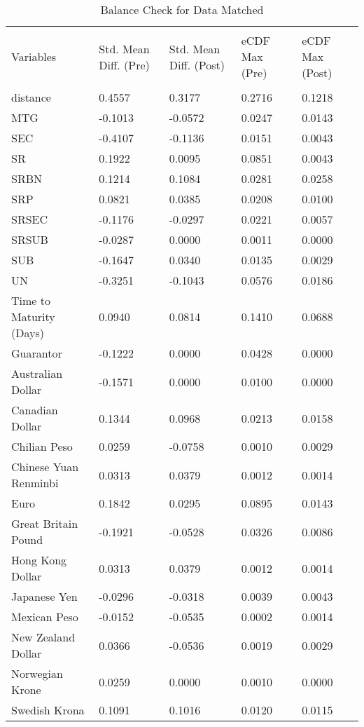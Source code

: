 \begin{table}[H]
\caption{Balance Check for Data Matched}
\scriptsize
\begin{tabular}{lllll}
\\[-1.8ex]\hline 
\hline \\[-1.8ex]
Variables & Std. Mean Diff. (Pre) & Std. Mean Diff. (Post) & eCDF Max (Pre) & eCDF Max (Post) \\
\hline \\[-1.8ex]
distance & 0.4557 & 0.3177 & 0.2716 & 0.1218 \\
MTG & -0.1013 & -0.0572 & 0.0247 & 0.0143 \\
SEC & -0.4107 & -0.1136 & 0.0151 & 0.0043 \\
SR & 0.1922 & 0.0095 & 0.0851 & 0.0043 \\
SRBN & 0.1214 & 0.1084 & 0.0281 & 0.0258 \\
SRP & 0.0821 & 0.0385 & 0.0208 & 0.0100 \\
SRSEC & -0.1176 & -0.0297 & 0.0221 & 0.0057 \\
SRSUB & -0.0287 & 0.0000 & 0.0011 & 0.0000 \\
SUB & -0.1647 & 0.0340 & 0.0135 & 0.0029 \\
UN & -0.3251 & -0.1043 & 0.0576 & 0.0186 \\
Time to Maturity (Days) & 0.0940 & 0.0814 & 0.1410 & 0.0688 \\
Guarantor & -0.1222 & 0.0000 & 0.0428 & 0.0000 \\
Australian Dollar & -0.1571 & 0.0000 & 0.0100 & 0.0000 \\
Canadian Dollar & 0.1344 & 0.0968 & 0.0213 & 0.0158 \\
Chilian Peso & 0.0259 & -0.0758 & 0.0010 & 0.0029 \\
Chinese Yuan Renminbi & 0.0313 & 0.0379 & 0.0012 & 0.0014 \\
Euro & 0.1842 & 0.0295 & 0.0895 & 0.0143 \\
Great Britain Pound & -0.1921 & -0.0528 & 0.0326 & 0.0086 \\
Hong Kong Dollar & 0.0313 & 0.0379 & 0.0012 & 0.0014 \\
Japanese Yen & -0.0296 & -0.0318 & 0.0039 & 0.0043 \\
Mexican Peso & -0.0152 & -0.0535 & 0.0002 & 0.0014 \\
New Zealand Dollar & 0.0366 & -0.0536 & 0.0019 & 0.0029 \\
Norwegian Krone & 0.0259 & 0.0000 & 0.0010 & 0.0000 \\
Swedish Krona & 0.1091 & 0.1016 & 0.0120 & 0.0115 \\

\end{tabular}
\end{table}
